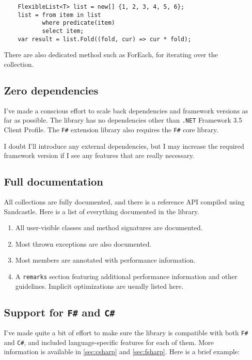 \documentclass[]{article}
\newcommand{\code}[1]{\texttt{#1}}
\newcommand{\dotnet}{\texttt{.NET}\xspace}
\newcommand{\fsh}{\texttt{F\#}\xspace}
\newcommand{\csh}{\texttt{C\#}\xspace}
\begin{document}
\begin{lstlisting}
	FlexibleList<T> list = new[] {1, 2, 3, 4, 5, 6}; 
	list = from item in list 
		   where predicate(item)
		   select item;
	var result = list.Fold((fold, cur) => cur * fold);
\end{lstlisting}

There are also dedicated method such as ForEach, for iterating over the collection. 

\subsection{Zero dependencies}\label{sec:dependencies}
I've made a conscious effort to scale back dependencies and framework versions as far as possible. The library has no dependencies other than \dotnet Framework 3.5 Client Profile. The \fsh extension library also requires the \fsh core library.

I doubt I'll introduce any external dependencies, but I may increase the required framework version if I see any features that are really necessary.

\subsection{Full documentation}\label{sec:documentation}
All collections are fully documented, and there is a reference API compiled using Sandcastle. Here is a list of everything documented in the library.
\begin{enumerate}
	\item All user-visible classes and method signatures are documented.
	\item Most thrown exceptions are also documented.
	\item Most members are annotated with performance information.
	\item A \code{remarks} section featuring additional performance information and other guidelines. Implicit optimizations are usually listed here.
\end{enumerate}

\subsection{Support for \fsh and \csh}
I've made quite a bit of effort to make sure the library is compatible with both \fsh and \csh, and included language-specific features for each of them. More information is available in \cref{sec:csharp} and \cref{sec:fsharp}. Here is a brief example:
\end{document}
